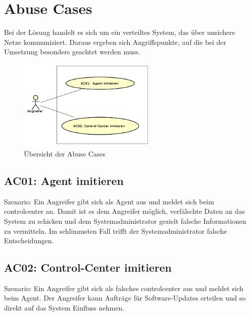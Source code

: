 \section{Abuse Cases}
\label{sec:abuse_cases}

Bei der Lösung handelt es sich um ein verteiltes System, das über unsichere Netze kommuniziert. Daraus ergeben sich Angriffspunkte, auf die bei der Umsetzung besonders geachtet werden muss.

\begin{figure}
  \centering
    \includegraphics[width=0.6\textwidth]{files/AbuseCases_small}
  \caption{Übersicht der Abuse Cases}
  \label{fig:abusecases}
\end{figure}

\subsection*{AC01: Agent imitieren}
\label{auc:01}

    Szenario: Ein Angreifer gibt sich als Agent aus und meldet sich beim \gls{controlcenter} an. Damit ist es dem Angreifer möglich, verfälschte Daten an das System zu schicken und dem Systemadministrator gezielt falsche Informationen zu vermitteln. Im schlimmsten Fall trifft der Systemadministrator falsche Entscheidungen.

\subsection*{AC02: Control-Center imitieren}
\label{auc:02}

Szenario: Ein Angreifer gibt sich als falsches \gls{controlcenter} aus und meldet sich beim Agent. Der Angreifer kann Aufträge für Software-Updates erteilen und so direkt auf das System Einfluss nehmen.